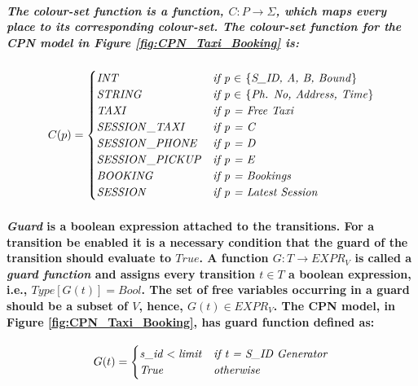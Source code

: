 \subparagraph*{\textnormal{The \textbf{\textit{colour-set function}} is a function, $\mathit{C : P \rightarrow \Sigma}$, which maps every place to its corresponding colour-set. The colour-set function for the CPN model in Figure \ref{fig:CPN_Taxi_Booking} is:}}

\begin{equation*}
C(p) = \begin{cases}
\mathit{INT} & \textit{if p $\in$ \textnormal{\{}S\_ID, A, B, Bound\textnormal{\}}}\\
\mathit{STRING} & \textit{if p $\in$ \textnormal{\{}Ph. No, Address, Time\textnormal{\}}}\\
\mathit{TAXI} & \textit{if p = Free Taxi}\\
\mathit{SESSION\_TAXI} & \textit{if p = C}\\
\mathit{SESSION\_PHONE} & \textit{if p = D}\\
\mathit{SESSION\_PICKUP} & \textit{if p = E}\\
\mathit{BOOKING} & \textit{if p = Bookings} \\
\mathit{SESSION} & \textit{if p = Latest Session}
\end{cases}
\end{equation*}
\paragraph*{\textnormal{\textit{Guard} is a boolean expression attached to the transitions. For a transition be enabled it is a necessary condition that the guard of the transition should evaluate to $\mathit{True}$. A function $\mathit{G : T \rightarrow EXPR_{V}}$ is called a \textbf{\textit{guard function}} and assigns every transition $\mathit{t \in T}$ a boolean expression, i.e., $\mathit{Type[G(t)] = Bool}$. The set of free variables occurring in a guard should be a subset of $\mathit{V}$, hence, $\mathit{G(t) \in EXPR_{V}}$. The CPN model, in Figure \ref{fig:CPN_Taxi_Booking}, has guard function defined as:
}}

\begin{equation*}
G(t) = \begin{cases}
\mathit{s\_id < limit} & $\textit{if t = S\_ID Generator}$\\
\mathit{True} & $\textit{otherwise}$
\end{cases}
\end{equation*}


